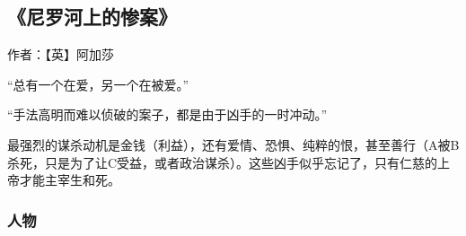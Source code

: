 \subsection{《尼罗河上的惨案》}

作者：【英】阿加莎

“总有一个在爱，另一个在被爱。”

“手法高明而难以侦破的案子，都是由于凶手的一时冲动。”

最强烈的谋杀动机是金钱（利益），还有爱情、恐惧、纯粹的恨，甚至善行（A被B杀死，只是为了让C受益，或者政治谋杀）。这些凶手似乎忘记了，只有仁慈的上帝才能主宰生和死。

\subsubsection{人物}

